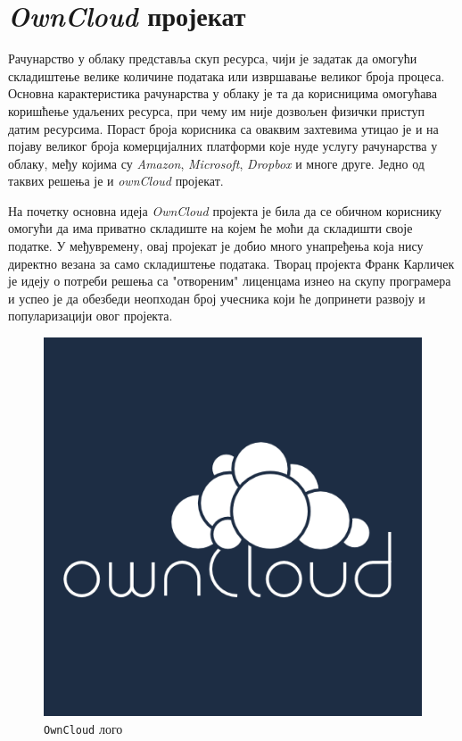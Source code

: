 \chapter{\textit{OwnCloud} пројекат}
\label{chap:ownCloud}
Рачунарство у облаку представља скуп ресурса, чији је задатак да омогући складиштење велике количине података или извршавање великог броја процеса. Основна карактеристика рачунарства у облаку је та да корисницима омогућава коришћење удаљених ресурса, при чему им није дозвољен физички приступ датим ресурсима. Пораст броја корисника са оваквим захтевима утицао је и на појаву великог броја комерцијалних платформи које нуде услугу рачунарства у облаку, међу којима су \textit{Amazon}, \textit{Microsoft}, \textit{Dropbox} и многе друге. Једно од таквих решења је и \textit{ownCloud}\cite{owncloud} пројекат. 

На почетку основна идеја \textit{OwnCloud} пројекта је била да се обичном кориснику омогући да има приватно складиште на којем ће моћи да складишти своје податке. У међувремену, овај пројекат је добио много унапређења која нису директно везана за само складиштење података. Творац пројекта  Франк Карличек је идеју о потреби решења са "отвореним" лиценцама изнео на скупу програмера и успео је да обезбеди неопходан број учесника који ће допринети развоју и популаризацији овог пројекта.

\begin{figure}[H]
	\centering
	\includegraphics[scale=0.4]{slike/owncloud_logo.png}
	\caption{\texttt{OwnCloud} лого}
\end{figure}

